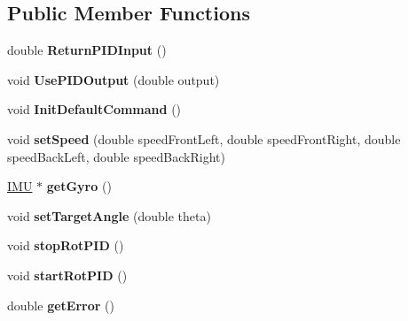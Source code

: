 \subsection*{Public Member Functions}
\begin{DoxyCompactItemize}
\item 
\hypertarget{class_drive_bae_ac2497d0afa36b5c72f2ee86f8fd892cf}{}double {\bfseries Return\+P\+I\+D\+Input} ()\label{class_drive_bae_ac2497d0afa36b5c72f2ee86f8fd892cf}

\item 
\hypertarget{class_drive_bae_a423ddc49659be37aed2c0509cc55289b}{}void {\bfseries Use\+P\+I\+D\+Output} (double output)\label{class_drive_bae_a423ddc49659be37aed2c0509cc55289b}

\item 
\hypertarget{class_drive_bae_a2adbbdb59bb0fdc9ed466a3d2edd92ff}{}void {\bfseries Init\+Default\+Command} ()\label{class_drive_bae_a2adbbdb59bb0fdc9ed466a3d2edd92ff}

\item 
\hypertarget{class_drive_bae_a1d381de7dfb03bd3dd138a889c01e880}{}void {\bfseries set\+Speed} (double speed\+Front\+Left, double speed\+Front\+Right, double speed\+Back\+Left, double speed\+Back\+Right)\label{class_drive_bae_a1d381de7dfb03bd3dd138a889c01e880}

\item 
\hypertarget{class_drive_bae_ae0cfe1125d3065eb915111e29e49281c}{}\hyperlink{class_i_m_u}{I\+M\+U} $\ast$ {\bfseries get\+Gyro} ()\label{class_drive_bae_ae0cfe1125d3065eb915111e29e49281c}

\item 
\hypertarget{class_drive_bae_a489a12b403e0b818083402007ea2e314}{}void {\bfseries set\+Target\+Angle} (double theta)\label{class_drive_bae_a489a12b403e0b818083402007ea2e314}

\item 
\hypertarget{class_drive_bae_ab6042ad688723f278787c3747de2f263}{}void {\bfseries stop\+Rot\+P\+I\+D} ()\label{class_drive_bae_ab6042ad688723f278787c3747de2f263}

\item 
\hypertarget{class_drive_bae_aad5e482e88ca3b39ca054cea1217dc6b}{}void {\bfseries start\+Rot\+P\+I\+D} ()\label{class_drive_bae_aad5e482e88ca3b39ca054cea1217dc6b}

\item 
\hypertarget{class_drive_bae_a813f9dfbe7bf7691de735c74e88548d2}{}double {\bfseries get\+Error} ()\label{class_drive_bae_a813f9dfbe7bf7691de735c74e88548d2}


\end{DoxyCompactItemize}
